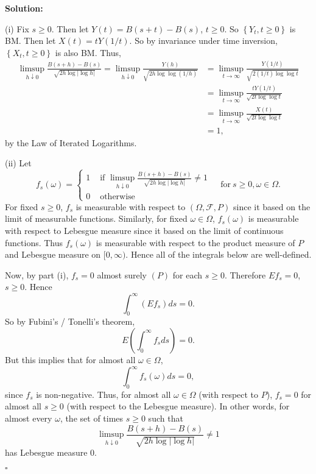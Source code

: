 \documentclass[12pt]{article}
\newcounter{ProofCounter}
\newenvironment{Solution}{\stepcounter{ProofCounter}\textbf{Solution:}}{\hfill$\square$}
\newcommand\toinf{\rightarrow\infty}
\begin{document}
\begin{Solution}

  (i) Fix $s \geq 0$. Then let $Y(t) = B(s + t) - B(s)$, $t \geq 0$. So $ \left\{ Y_t, t \geq 0 \right\} $ is BM. Then let $X(t) = tY(1/t)$. So by invariance under time inversion, $ \left\{ X_t, t \geq 0 \right\}$ is also BM. Thus,
  \begin{align*}
  \limsup_{h\downarrow 0} \frac{B(s + h) - B(s)}{\sqrt{2h \log|\log h|}} = \limsup_{h\downarrow 0} \frac{Y(h)}{\sqrt{2h\log\log(1/h)}} & = \limsup_{t\rightarrow\infty} \frac{Y(1/t)}{\sqrt{2(1/t)\log\log t}} \\
  & = \limsup_{t\rightarrow\infty} \frac{tY(1/t)}{\sqrt{2t\log\log t}} \\
  & = \limsup_{t\toinf} \frac{X(t)}{\sqrt{2t\log\log t}} \\
  & = 1,
  \end{align*}
  by the Law of Iterated Logarithms.

  (ii) Let
  \[
    f_s(\omega) = \begin{cases}{}
      1 & \text{ if } \limsup_{h\downarrow 0} \frac{B(s + h) - B(s)}{\sqrt{2h\log|\log h|}} \neq 1 \\
      0 & \text{ otherwise }
    \end{cases} \ \ \  \ \ \text{for} \ s \geq 0, \omega \in \Omega.
  \]
  For fixed $s \geq 0$, $f_s$ is measurable with respect to $(\Omega, \mathcal{F}, P)$ since it based on the limit of measurable functions. Similarly, for fixed $\omega \in \Omega$, $f_s(\omega)$ is measurable with respect to Lebesgue measure since it based on the limit of continuous functions. Thus $f_s(\omega)$ is measurable with respect to the product measure of $P$ and Lebesgue measure on $[0, \infty)$. Hence all of the integrals below are well-defined.

  Now, by part (i), $f_s = 0$ almost surely $(P)$ for each $s \geq 0$. Therefore $Ef_s = 0$, $s \geq 0$. Hence
  \[
    \int_{0}^{\infty} (Ef_s) ds = 0.
  \]
  So by Fubini's / Tonelli's theorem,
  \[
    E \left( \int_{0}^{\infty} f_s ds \right) = 0.
  \]
  But this implies that for almost all $\omega \in \Omega$,
  \[
    \int_{0}^{\infty} f_s(\omega) ds = 0,
  \]
  since $f_s$ is non-negative. Thus, for almost all $\omega \in \Omega$ (with respect to $P$), $f_s = 0$ for almost all $s \geq 0$ (with respect to the Lebesgue measure).
  In other words, for almost every $\omega$, the set of times $s \geq 0$ such that
  \begin{equation}
    \limsup_{h\downarrow 0} \frac{B(s + h) - B(s)}{\sqrt{2h\log|\log h|}} \neq 1
    \label{2.1}
  \end{equation}
  has Lebesgue measure 0.


\end{Solution}
\end{document}
